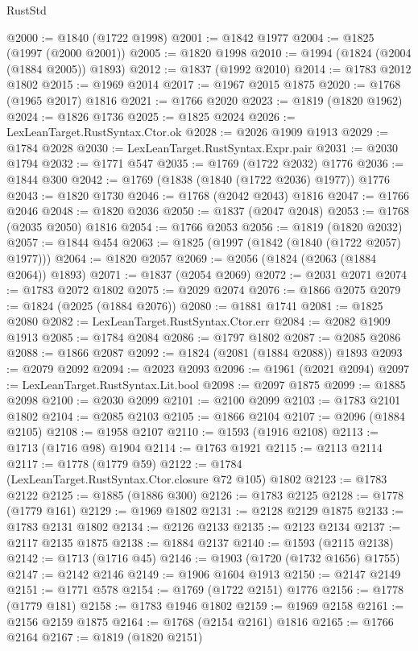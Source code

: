 \begin{lexlean}{RustStd}
\begin{coremodule}
@2000 := @1840 (@1722 @1998)
@2001 := @1842 @1977
@2004 := @1825 (@1997 (@2000 @2001))
@2005 := @1820 @1998
@2010 := @1994 (@1824 (@2004 (@1884 @2005)) @1893)
@2012 := @1837 (@1992 @2010)
@2014 := @1783 @2012 @1802
@2015 := @1969 @2014
@2017 := @1967 @2015 @1875
@2020 := @1768 (@1965 @2017) @1816
@2021 := @1766 @2020
@2023 := @1819 (@1820 @1962)
@2024 := @1826 @1736
@2025 := @1825 @2024
@2026 := LexLeanTarget.RustSyntax.Ctor.ok
@2028 := @2026 @1909 @1913
@2029 := @1784 @2028
@2030 := LexLeanTarget.RustSyntax.Expr.pair
@2031 := @2030 @1794
@2032 := @1771 @547
@2035 := @1769 (@1722 @2032) @1776
@2036 := @1844 @300
@2042 := @1769 (@1838 (@1840 (@1722 @2036) @1977)) @1776
@2043 := @1820 @1730
@2046 := @1768 (@2042 @2043) @1816
@2047 := @1766 @2046
@2048 := @1820 @2036
@2050 := @1837 (@2047 @2048)
@2053 := @1768 (@2035 @2050) @1816
@2054 := @1766 @2053
@2056 := @1819 (@1820 @2032)
@2057 := @1844 @454
@2063 := @1825 (@1997 (@1842 (@1840 (@1722 @2057) @1977)))
@2064 := @1820 @2057
@2069 := @2056 (@1824 (@2063 (@1884 @2064)) @1893)
@2071 := @1837 (@2054 @2069)
@2072 := @2031 @2071
@2074 := @1783 @2072 @1802
@2075 := @2029 @2074
@2076 := @1866 @2075
@2079 := @1824 (@2025 (@1884 @2076))
@2080 := @1881 @1741
@2081 := @1825 @2080
@2082 := LexLeanTarget.RustSyntax.Ctor.err
@2084 := @2082 @1909 @1913
@2085 := @1784 @2084
@2086 := @1797 @1802
@2087 := @2085 @2086
@2088 := @1866 @2087
@2092 := @1824 (@2081 (@1884 @2088)) @1893
@2093 := @2079 @2092
@2094 := @2023 @2093
@2096 := @1961 (@2021 @2094)
@2097 := LexLeanTarget.RustSyntax.Lit.bool
@2098 := @2097 @1875
@2099 := @1885 @2098
@2100 := @2030 @2099
@2101 := @2100 @2099
@2103 := @1783 @2101 @1802
@2104 := @2085 @2103
@2105 := @1866 @2104
@2107 := @2096 (@1884 @2105)
@2108 := @1958 @2107
@2110 := @1593 (@1916 @2108)
@2113 := @1713 (@1716 @98) @1904
@2114 := @1763 @1921
@2115 := @2113 @2114
@2117 := @1778 (@1779 @59)
@2122 := @1784 (LexLeanTarget.RustSyntax.Ctor.closure @72 @105) @1802
@2123 := @1783 @2122
@2125 := @1885 (@1886 @300)
@2126 := @1783 @2125
@2128 := @1778 (@1779 @161)
@2129 := @1969 @1802
@2131 := @2128 @2129 @1875
@2133 := @1783 @2131 @1802
@2134 := @2126 @2133
@2135 := @2123 @2134
@2137 := @2117 @2135 @1875
@2138 := @1884 @2137
@2140 := @1593 (@2115 @2138)
@2142 := @1713 (@1716 @45)
@2146 := @1903 (@1720 (@1732 @1656) @1755)
@2147 := @2142 @2146
@2149 := @1906 @1604 @1913
@2150 := @2147 @2149
@2151 := @1771 @578
@2154 := @1769 (@1722 @2151) @1776
@2156 := @1778 (@1779 @181)
@2158 := @1783 @1946 @1802
@2159 := @1969 @2158
@2161 := @2156 @2159 @1875
@2164 := @1768 (@2154 @2161) @1816
@2165 := @1766 @2164
@2167 := @1819 (@1820 @2151)

\end{coremodule}
\end{lexlean}
